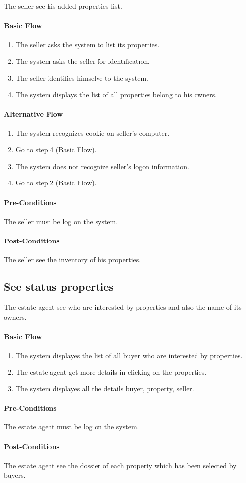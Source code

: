 \documentclass[a4paper,12pt]{article}
\begin{document}
The seller see his added properties list.

\paragraph{Basic Flow}
\begin{enumerate}
\item The seller asks the system to list its properties.
\item The system asks the seller for identification.
\item The seller identifies himselve to the system.
\item The system displays the list of all properties belong to his owners.
\end{enumerate}
\paragraph{Alternative Flow}
\begin{enumerate}
\item The system recognizes cookie on seller's computer. 
\item Go to step 4 (Basic Flow).
\item The system does not recognize seller's logon information.
\item Go to step 2 (Basic Flow).
\end{enumerate}
\paragraph{Pre-Conditions}
The seller must be log on the system.
\paragraph{Post-Conditions}
The seller see the inventory of his properties.

\subsection{See status properties}

The estate agent see who are interested by properties and also the name of its owners.

\paragraph{Basic Flow}
\begin{enumerate}
\item The system displayes the list of all buyer who are interested by properties.
\item The estate agent get more details in clicking on the properties.
\item The system displayes all the details buyer, property, seller.
\end{enumerate}
\paragraph{Pre-Conditions}
The estate agent must be log on the system.
\paragraph{Post-Conditions}
The estate agent see the dossier of each property which has been selected by buyers.
\end{document}
